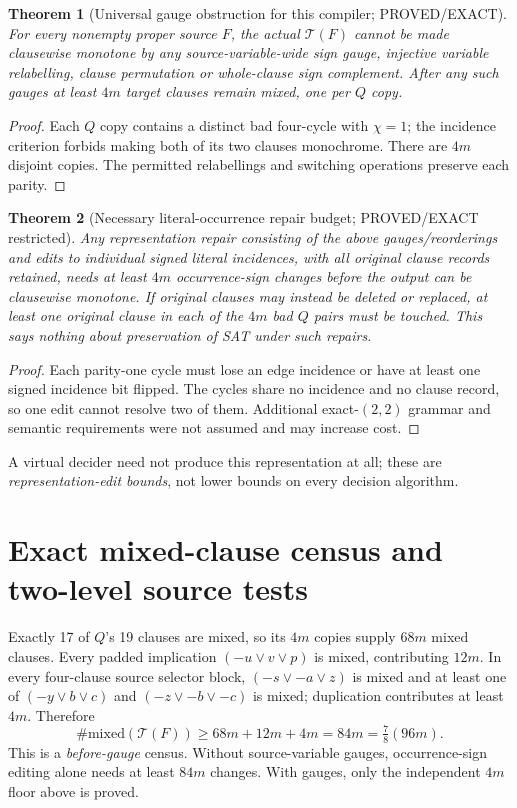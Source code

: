 \documentclass[11pt]{article}
\newtheorem{theorem}{Theorem}
\begin{document}
\begin{theorem}[Universal gauge obstruction for this compiler; PROVED/EXACT]
For every nonempty proper source $F$, the actual $\mathcal T(F)$ cannot be made clausewise monotone by any source-variable-wide sign gauge, injective variable relabelling, clause permutation or whole-clause sign complement. After any such gauges at least $4m$ target clauses remain mixed, one per $Q$ copy.
\end{theorem}
\begin{proof}
Each $Q$ copy contains a distinct bad four-cycle with $\chi=1$; the incidence criterion forbids making both of its two clauses monochrome. There are $4m$ disjoint copies. The permitted relabellings and switching operations preserve each parity.
\end{proof}

\begin{theorem}[Necessary literal-occurrence repair budget; PROVED/EXACT restricted]
Any representation repair consisting of the above gauges/reorderings and edits to individual signed literal \emph{incidences}, with all original clause records retained, needs at least $4m$ occurrence-sign changes before the output can be clausewise monotone. If original clauses may instead be deleted or replaced, at least one original clause in each of the $4m$ bad $Q$ pairs must be touched. This says nothing about preservation of SAT under such repairs.
\end{theorem}
\begin{proof}
Each parity-one cycle must lose an edge incidence or have at least one signed incidence bit flipped. The cycles share no incidence and no clause record, so one edit cannot resolve two of them. Additional exact-$(2,2)$ grammar and semantic requirements were not assumed and may increase cost.
\end{proof}
A virtual decider need not produce this representation at all; these are \emph{representation-edit bounds}, not lower bounds on every decision algorithm.

\section{Exact mixed-clause census and two-level source tests}
Exactly 17 of $Q$'s 19 clauses are mixed, so its $4m$ copies supply $68m$ mixed clauses. Every padded implication $(-u\lor v\lor p)$ is mixed, contributing $12m$. In every four-clause source selector block, $(-s\lor-a\lor z)$ is mixed and at least one of $(-y\lor b\lor c)$ and $(-z\lor-b\lor-c)$ is mixed; duplication contributes at least $4m$. Therefore
\begin{equation}
\#\mathrm{mixed}(\mathcal T(F))\ge 68m+12m+4m=84m=\tfrac78(96m). \label{eq:mixed}
\end{equation}
This is a \emph{before-gauge} census. Without source-variable gauges, occurrence-sign editing alone needs at least $84m$ changes. With gauges, only the independent $4m$ floor above is proved.
\end{document}
